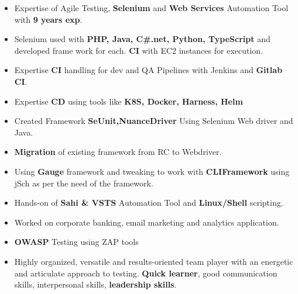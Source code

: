 

\begin{cvparagraph}

\begin{itemize}
 \item {Expertise of Agile Testing, \textbf{Selenium} and \textbf{Web Services} Automation Tool with \textbf{9 years exp}.}

 \item {Selenium used with \textbf{PHP, Java, C\#.net, Python, TypeScript} and developed frame work for each. \textbf{CI} with EC2 instances for execution.}
 
 \item {Expertise \textbf{CI} handling for dev and QA Pipelines with Jenkins and \textbf{Gitlab CI}}.
 
 \item  {Expertise \textbf{CD} using tools like \textbf{K8S, Docker, Harness, Helm}}

 \item {Created Framework \textbf{SeUnit,NuanceDriver} Using Selenium Web driver and Java.}

 \item {\textbf{Migration} of existing framework from RC to Webdriver.}

 \item {Using \textbf{Gauge} framework and tweaking to work with \textbf{CLIFramework} using jSch as per the need of the framework.}

 \item {Hands-on of \textbf{Sahi \& VSTS} Automation Tool and \textbf{Linux/Shell} scripting.}

 \item {Worked on corporate banking, email marketing and analytics application.}

 \item {\textbf{OWASP} Testing using ZAP tools}

 \item {Highly organized, versatile and results-oriented team player with an energetic and articulate approach to testing. \textbf{Quick learner}, good communication skills, interpersonal skills, \textbf{leadership skills}.}


\end{itemize}
\end{cvparagraph}
